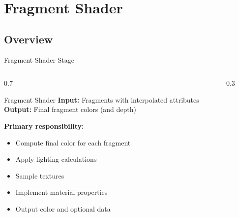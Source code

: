 \section{Fragment Shader}

\subsection{Overview}
\begin{frame}{Fragment Shader Stage}
  \begin{columns}
    \small
    \begin{column}{0.7\textwidth}
      \begin{raybox}{Fragment Shader}
        \textbf{Input:} Fragments with interpolated attributes \\
        \textbf{Output:} Final fragment colors (and depth)

        \vspace{0.3cm}
        \textbf{Primary responsibility:}
        \begin{itemize}
          \item<1-> Compute final color for each fragment
          \item<2-> Apply lighting calculations
          \item<3-> Sample textures
          \item<4-> Implement material properties
          \item<5-> Output color and optional data
        \end{itemize}
      \end{raybox}
    \end{column}
    \begin{column}{0.3\textwidth}
      \begin{center}

\end{center}
\end{column}
\end{columns}
\end{frame}
